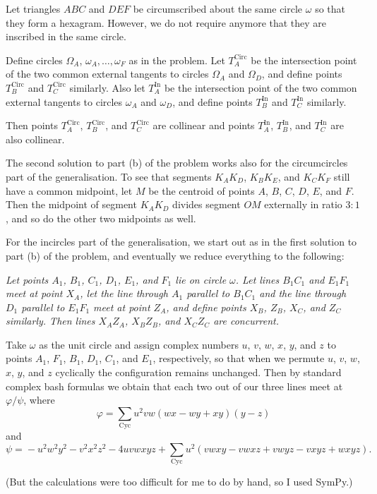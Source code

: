 \documentclass[11pt]{scrartcl}
\begin{document}
\begin{remark*}
Let triangles $ABC$ and $DEF$ be circumscribed about the same circle $\omega$ so that they form a hexagram. However, we do not require anymore that they are inscribed in the same circle.

Define circles $\Omega_A$, $\omega_A, \dots, \omega_F$ as in the problem.
Let $T^\text{Circ}_A$ be the intersection point of the two common external
tangents to circles $\Omega_A$ and $\Omega_D$, and define points $T^\text{Circ}_B$
and $T^\text{Circ}_C$ similarly. Also let $T^\text{In}_A$ be the intersection
point of the two common external tangents to circles $\omega_A$ and $\omega_D$, and define
points $T^\text{In}_B$ and $T^\text{In}_C$ similarly.

Then points $T^\text{Circ}_A$, $T^\text{Circ}_B$, and $T^\text{Circ}_C$ are collinear
and points $T^\text{In}_A$, $T^\text{In}_B$, and $T^\text{In}_C$ are also
collinear.

The second solution to part (b) of the problem works also for the circumcircles
part of the generalisation. To see that segments $K_AK_D$, $K_BK_E$, and
$K_CK_F$ still have a common midpoint, let $M$ be the centroid of points $A$,
$B$, $C$, $D$, $E$, and $F$. Then the midpoint of segment $K_AK_D$ divides
segment $OM$ externally in ratio $3 : 1$, and so do the other two midpoints as
well.

For the incircles part of the generalisation, we start out as in the first
solution to part (b) of the problem, and eventually we reduce everything to the
following:

\emph{Let points $A_1$, $B_1$, $C_1$, $D_1$, $E_1$, and $F_1$ lie on circle $\omega$. Let lines $B_1C_1$ and $E_1F_1$ meet at point $X_A$, let the line through $A_1$ parallel to $B_1C_1$ and the line through $D_1$ parallel to $E_1F_1$ meet at point $Z_A$, and define points $X_B$, $Z_B$, $X_C$, and $Z_C$ similarly. Then lines $X_AZ_A$, $X_BZ_B$, and $X_CZ_C$ are concurrent.}

Take $\omega$ as the unit circle and assign complex numbers $u$, $v$, $w$, $x$, $y$, and $z$ to points $A_1$, $F_1$, $B_1$, $D_1$, $C_1$, and $E_1$, respectively, so that when we permute $u$, $v$, $w$, $x$, $y$, and $z$ cyclically the configuration remains unchanged. Then by standard complex bash formulas we obtain that each two out of our three lines meet at $\varphi/\psi$, where \[\varphi = \sum_\text{Cyc} u^2vw(wx - wy + xy)(y - z)\] and \[\psi = {} - u^2w^2y^2 - v^2x^2z^2 - 4uvwxyz + \sum_\text{Cyc} u^2(vwxy - vwxz + vwyz - vxyz + wxyz).\]

(But the calculations were too difficult for me to do by hand, so I used SymPy.)
\end{remark*}
\end{document}
